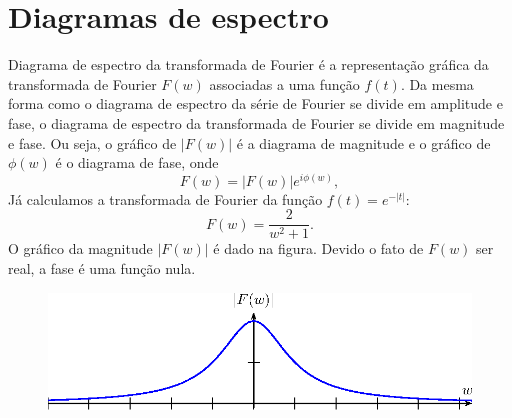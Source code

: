 \documentclass[a4paper,10pt]{book}
\begin{document}
 \section{Diagramas de espectro}
Diagrama de espectro da transformada de Fourier é a representação gráfica da transformada de Fourier $F(w)$ associadas a uma função $f(t)$. Da mesma forma como o diagrama de espectro da série de Fourier se divide em amplitude e fase, o diagrama de espectro da transformada de Fourier se divide em magnitude e fase. Ou seja, o gráfico de $|F(w)|$ é a diagrama de magnitude e o gráfico de $\phi(w)$ é o diagrama de fase, onde
\begin{equation}
F(w)=|F(w)|e^{i\phi(w)},
\end{equation}
Já calculamos a transformada de Fourier da função $f(t)=e^{-|t|}$:
 \begin{equation}
 F(w)=\frac{2}{w^2+1}.
 \end{equation}
 O gráfico da magnitude $|F(w)|$ é dado na figura. Devido o fato de $F(w)$ ser real, a fase é uma função nula.
 \begin{figure}[!ht]
 \begin{center}
 \includegraphics{figs/cap_diagramas_espectro_transformada_figura_1}\end{center}
 \end{figure}
\end{document}
